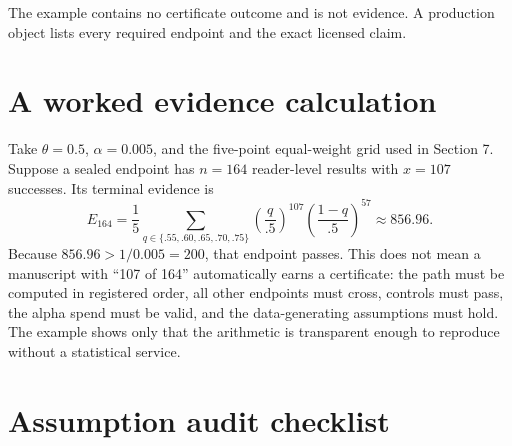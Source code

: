 \documentclass[11pt]{article}
\theoremstyle{remark}
\begin{document}
The example contains no certificate outcome and is not evidence. A production object lists
every required endpoint and the exact licensed claim.

\section{A worked evidence calculation}

Take $\theta=0.5$, $\alpha=0.005$, and the five-point equal-weight grid used in Section 7.
Suppose a sealed endpoint has $n=164$ reader-level results with $x=107$ successes. Its
terminal evidence is
\[
 E_{164} = \frac15\sum_{q\in\{.55,.60,.65,.70,.75\}}
       \left(\frac q{.5}\right)^{107}
       \left(\frac{1-q}{.5}\right)^{57}
       \approx 856.96.
\]
Because $856.96>1/0.005=200$, that endpoint passes. This does not mean a manuscript with
``107 of 164'' automatically earns a certificate: the path must be computed in registered
order, all other endpoints must cross, controls must pass, the alpha spend must be valid, and
the data-generating assumptions must hold. The example shows only that the arithmetic is
transparent enough to reproduce without a statistical service.

\section{Assumption audit checklist}
\end{document}
